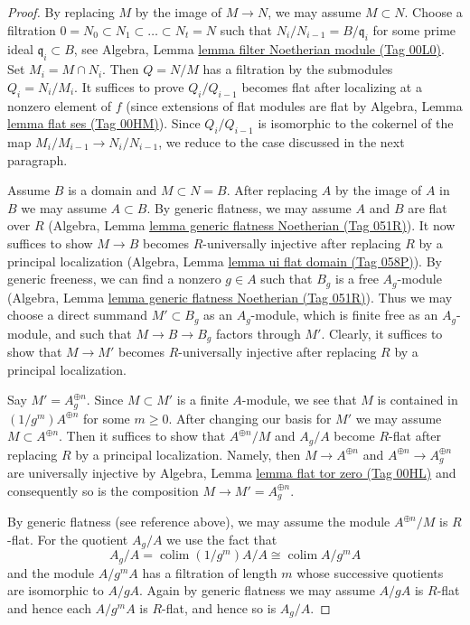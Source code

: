 \documentclass{amsart}
\theoremstyle{plain}
\theoremstyle{definition}
\theoremstyle{remark}
\numberwithin{equation}{subsection}
\def\colim{\mathop{\mathrm{colim}}\nolimits}
\begin{document}
\begin{proof}
By replacing $M$ by the image of $M \to N$, we may assume $M \subset N$.
Choose a filtration $0 = N_0 \subset N_1 \subset \ldots \subset N_t = N$
such that $N_i/N_{i - 1} = B/\mathfrak q_i$ for some prime ideal
$\mathfrak q_i \subset B$, see
Algebra, Lemma \href{https://stacks.math.columbia.edu/tag/00L0}{lemma filter Noetherian module (Tag 00L0)}.
Set $M_i = M \cap N_i$. Then $Q = N/M$ has a filtration by the submodules
$Q_i = N_i/M_i$. It suffices to prove $Q_i/Q_{i - 1}$ becomes flat
after localizing at a nonzero element of $f$ (since extensions of
flat modules are flat by Algebra, Lemma \href{https://stacks.math.columbia.edu/tag/00HM}{lemma flat ses (Tag 00HM)}).
Since $Q_i/Q_{i - 1}$ is isomorphic to the  cokernel
of the map $M_i/M_{i - 1} \to N_i/N_{i - 1}$, we reduce to the
case discussed in the next paragraph.

\medskip\noindent
Assume $B$ is a domain and $M \subset N = B$. After replacing $A$ by the
image of $A$ in $B$ we may assume $A \subset B$. By generic flatness,
we may assume $A$ and $B$ are flat over $R$
(Algebra, Lemma \href{https://stacks.math.columbia.edu/tag/051R}{lemma generic flatness Noetherian (Tag 051R)}).
It now suffices to show $M \to B$ becomes $R$-universally
injective after replacing $R$ by a principal localization
(Algebra, Lemma \href{https://stacks.math.columbia.edu/tag/058P}{lemma ui flat domain (Tag 058P)}).
By generic freeness, we can find a nonzero $g \in A$ such that
$B_g$ is a free $A_g$-module
(Algebra, Lemma \href{https://stacks.math.columbia.edu/tag/051R}{lemma generic flatness Noetherian (Tag 051R)}).
Thus we may choose a direct summand $M' \subset B_g$ as an $A_g$-module,
which is finite free as an $A_g$-module, and
such that $M \to B \to B_g$ factors through $M'$.
Clearly, it suffices to show that $M \to M'$
becomes $R$-universally injective after replacing
$R$ by a principal localization.

\medskip\noindent
Say $M' = A_g^{\oplus n}$. Since $M \subset M'$ is a finite $A$-module,
we see that $M$ is contained in $(1/g^m)A^{\oplus n}$ for some $m \geq 0$.
After changing our basis for $M'$ we may assume $M \subset A^{\oplus n}$.
Then it suffices to show that $A^{\oplus n}/M$ and $A_g/A$ become
$R$-flat after replacing $R$ by a principal localization. Namely, then
$M \to A^{\oplus n}$ and $A^{\oplus n} \to A_g^{\oplus n}$ are
universally injective by Algebra, Lemma \href{https://stacks.math.columbia.edu/tag/00HL}{lemma flat tor zero (Tag 00HL)}
and consequently so is the composition $M \to M' = A_g^{\oplus n}$.

\medskip\noindent
By generic flatness (see reference above), we may assume the
module $A^{\oplus n}/M$ is $R$-flat. For the quotient $A_g/A$
we use the fact that
$$
A_g/A = \colim (1/g^m)A/A \cong \colim A/g^mA
$$
and the module $A/g^mA$ has a filtration of length $m$ whose
successive quotients are isomorphic to $A/gA$. Again by generic
flatness we may assume $A/gA$ is $R$-flat and hence each $A/g^mA$
is $R$-flat, and hence so is $A_g/A$.
\end{proof}
\end{document}
